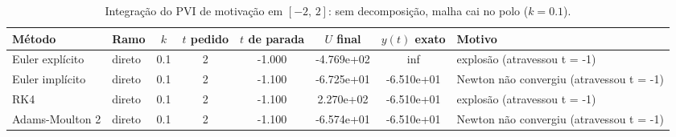 \begin{table}[H]
    \centering
    \small
    \begin{tabular}{llcccccl}
        \hline
        Método & Ramo & $k$ & $t$ pedido & $t$ de parada & $U$ final & $y(t)$ exato & Motivo \\
        \hline
        Euler explícito & direto & 0.1 & 2 & -1.000 & -4.769e+02 & inf & explosão (atravessou t = -1) \\
        Euler implícito & direto & 0.1 & 2 & -1.100 & -6.725e+01 & -6.510e+01 & Newton não convergiu (atravessou t = -1) \\
        RK4 & direto & 0.1 & 2 & -1.100 & 2.270e+02 & -6.510e+01 & explosão (atravessou t = -1) \\
        Adams-Moulton 2 & direto & 0.1 & 2 & -1.100 & -6.574e+01 & -6.510e+01 & Newton não convergiu (atravessou t = -1) \\
        \hline
    \end{tabular}
    \caption{Integração do PVI de motivação em $[-2,\, 2]$: sem decomposição, malha cai no polo ($k = 0.1$).}
    \label{tab:m2_2_sd_cai_polo}
\end{table}
